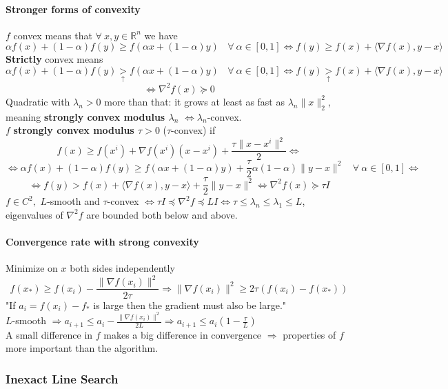 \documentclass[10pt]{report}
\begin{document}
\paragraph{Stronger forms of convexity}
$f$ convex means that $\forall\:x,y\in \mathbb{R}^n$ we have $$\alpha f(x) + (1-\alpha)f(y)\geq f(\alpha x+ (1-\alpha)y)\:\:\:\:\forall\:\alpha\in[0,1] \Leftrightarrow f(y)\geq f(x) + \langle \nabla f(x), y-x\rangle$$
\textbf{Strictly} convex means $$\alpha f(x) + (1-\alpha)f(y)\underset{\uparrow}{>} f(\alpha x+ (1-\alpha)y)\:\:\:\:\forall\:\alpha\in[0,1] \Leftrightarrow f(y)\underset{\uparrow}{>} f(x) + \langle \nabla f(x), y-x\rangle$$
$$\Leftrightarrow\nabla^2f(x)\succeq 0$$
Quadratic with $\lambda_n > 0$ more than that: it grows at least as fast as $\lambda_n\|x\|_2^2$, meaning \textbf{strongly convex modulus $\lambda_n$} $\Leftrightarrow \lambda_n$-convex.\\
$f$ \textbf{strongly convex modulus $\tau > 0$} ($\tau$-convex) if $$f(x)\geq f(x^i)+\nabla f(x^i)(x-x^i)+\frac{\tau\|x-x^i\|^2}{2}\Leftrightarrow$$ $$\Leftrightarrow\alpha f(x) + (1-\alpha)f(y)\geq f(\alpha x+ (1-\alpha)y)+\frac{\tau}{2}\alpha(1-\alpha)\|y-x\|^2\:\:\:\:\forall\:\alpha\in[0,1] \Leftrightarrow$$ $$\Leftrightarrow f(y)> f(x) + \langle \nabla f(x), y-x\rangle+\frac{\tau}{2}\|y-x\|^2 \Leftrightarrow\nabla^2 f(x) \succeq \tau I$$
$f \in C^2,$ $L$-smooth and $\tau$-convex $\Leftrightarrow \tau I \preceq \nabla^2 f\preceq LI \Leftrightarrow \tau \leq \lambda_n \leq \lambda_1 \leq L$, eigenvalues of $\nabla^2 f$ are bounded both below and above.
\paragraph{Convergence rate with strong convexity} Minimize on $x$ both sides independently $$f(x_*)\geq f(x_i) - \frac{\|\nabla f(x_i)\|^2}{2\tau} \Rightarrow \|\nabla f(x_i)\|^2\geq 2\tau(f(x_i)-f(x_*))$$
"If $a_i = f(x_i) - f_*$ is large then the gradient must also be large."\\
$L$-smooth $\Rightarrow a_{i+1}\leq a_i - \frac{\|\nabla f(x_i)\|^2}{2L} \Rightarrow a_{i+1}\leq a_i(1-\frac{\tau}{L})$\\
A small difference in $f$ makes a big difference in convergence $\Rightarrow$ properties of $f$ more important than the algorithm.
\subsubsection{Inexact Line Search}
\end{document}
